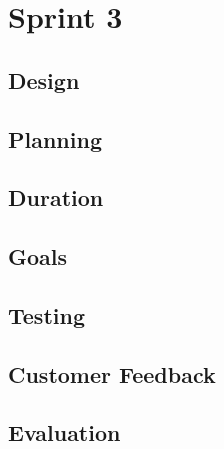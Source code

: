 \chapter{Sprint 3}
\section{Design}
\section{Planning}
\section{Duration}
\section{Goals}
\section{Testing}
\section{Customer Feedback}
\section{Evaluation}